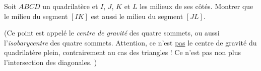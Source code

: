 \begin{exo}
Soit $ABCD$ un quadrilatère et $I$, $J$, $K$ et $L$ les milieux de ses côtés.
Montrer que le milieu du segment $[IK]$ est aussi le milieu du segment $[JL]$.

(Ce point est appelé le \emph{centre de gravité} des quatre sommets, ou aussi l'\emph{isobarycentre} des quatre sommets. Attention, ce n'est \underline{pas} le centre de gravité du quadrilatère plein, contrairement au cas des triangles ! Ce n'est pas non plus l'intersection des diagonales.
)
\begin{center}
\def\isobarycentre{
\tkzDefPoints{0/0/A, 5/0/B, 4/4/C, 1/3/D}
\tkzDefMidPoint(A,B)\tkzGetPoint{I}
\tkzDefMidPoint(B,C)\tkzGetPoint{J}
\tkzDefMidPoint(C,D)\tkzGetPoint{K}
\tkzDefMidPoint(D,A)\tkzGetPoint{L}
\tkzDefMidPoint(I,K)\tkzGetPoint{O}
\tkzDrawPolygon(A,B,C,D)
\tkzDrawPoints(A,B,C,D,I,J,K,L,O)
\tkzMarkSegments[mark=|||](A,I I,B)
\tkzMarkSegments[mark=||](B,J J,C)
\tkzMarkSegments[mark=|](C,K K,D)
\tkzMarkSegments[mark=s](D,L L,A)
\tkzAutoLabelPoints[center=O](A,B,C,D,I,J,K,L)
}
\hspace{1cm}
\end{center}
\end{exo}





